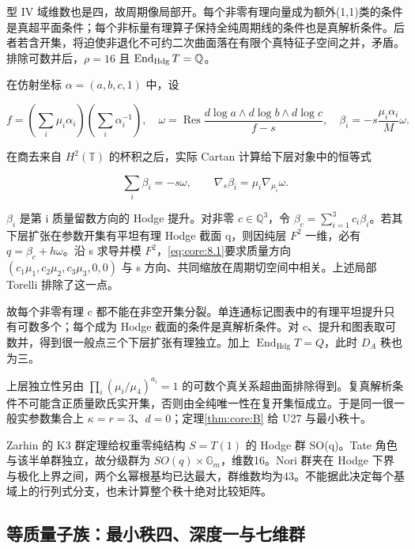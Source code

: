 \documentclass[11pt,a4paper,oneside]{ctexrep}
\theoremstyle{cnplain}
\theoremstyle{definition}
\theoremstyle{remark}
\begin{document}
型 IV 域维数也是四，故周期像局部开。每个非零有理向量成为额外(1,1)类的条件是真超平面条件；每个非标量有理算子保持全纯周期线的条件也是真解析条件。后者若含开集，将迫使非退化不可约二次曲面落在有限个真特征子空间之并，矛盾。排除可数并后，\(\rho=16\) 且 \(\operatorname{End}_{\rm Hdg}T=\mathbb Q\)。

在仿射坐标 \(\alpha=(a,b,c,1)\) 中，设

\begin{equation}
f=(\textstyle\sum_i\mu_i\alpha_i)(\sum_i\alpha_i^{-1}),
 \quad\omega=\operatorname{Res}\frac{d\log a\wedge d\log b\wedge d\log c}{f-s},
 \quad\beta_i=-s\frac{\mu_i\alpha_i}{M}\omega.
\end{equation}

在商去来自 \(H^2(\mathbb T)\) 的杯积之后，实际 Cartan 计算给下层对象中的恒等式

\begin{equation}
\sum_i\beta_i=-s\omega,\qquad
             \nabla_s\beta_i=\mu_i\nabla_{\mu_i}\omega. \label{eq:core:8.1}
\end{equation}

\(\beta _i\) 是第 i 质量留数方向的 Hodge 提升。对非零 \(c\in\mathbb Q^3\)，令 \(\beta_c=\sum_{i=1}^3c_i\beta_i\)。若其下层扩张在参数开集有平坦有理 Hodge 截面 q，则因纯层 \(F^2\) 一维，必有 \(q=\beta _c+h\omega \)。沿 s 求导并模 \(F^2\)，\eqref{eq:core:8.1}要求质量方向 \((c_1\mu_1,c_2\mu_2,c_3\mu_3,0,0)\) 与 s 方向、共同缩放在周期切空间中相关。上述局部 Torelli 排除了这一点。

故每个非零有理 c 都不能在非空开集分裂。单连通标记图表中的有理平坦提升只有可数多个；每个成为 Hodge 截面的条件是真解析条件。对 c、提升和图表取可数并，得到很一般点三个下层扩张有理独立。加上 \(\operatorname{End}_{\mathrm{Hdg}} T=Q\)，此时 \(D_A\) 秩也为三。

上层独立性另由 \(\prod_i(\mu_i/\mu_4)^{a_i}=1\) 的可数个真关系超曲面排除得到。复真解析条件不可能含正质量欧氏实开集，否则由全纯唯一性在复开集恒成立。于是同一很一般实参数集合上 \(\kappa =r=3\)、\(d=0\)；定理\ref{thm:core:B} 给 U27 与最小秩十。

Zarhin 的 K3 群定理\cite{zarhin}给权重零纯结构 \(S=T(1)\) 的 Hodge 群 SO(q)。Tate 角色与该半单群独立，故分级群为 \(SO(q)\times \mathbb G_m\)，维数16。Nori 群夹在 Hodge 下界与极化上界之间，两个幺幂根基均已达最大，群维数均为43。不能据此决定每个基域上的行列式分支，也未计算整个秩十绝对比较矩阵。

\subsection{等质量子族：最小秩四、深度一与七维群}\label{sec:core:8.1}
\end{document}
